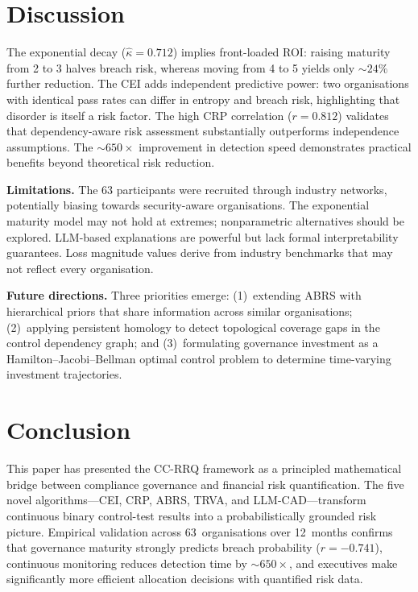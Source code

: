 \documentclass[conference]{IEEEtran}
\begin{document}
\section{Discussion}
\label{sec:discussion}

The exponential decay ($\hat\kappa=0.712$) implies front-loaded ROI: raising maturity from 2 to 3 halves breach risk, whereas moving from 4 to 5 yields only ${\sim}24\%$ further reduction. The CEI adds independent predictive power: two organisations with identical pass rates can differ in entropy and breach risk, highlighting that disorder is itself a risk factor. The high CRP correlation ($r=0.812$) validates that dependency-aware risk assessment substantially outperforms independence assumptions. The ${\sim}650\times$ improvement in detection speed demonstrates practical benefits beyond theoretical risk reduction.

\textbf{Limitations.} The 63 participants were recruited through industry networks, potentially biasing towards security-aware organisations. The exponential maturity model may not hold at extremes; nonparametric alternatives should be explored. LLM-based explanations are powerful but lack formal interpretability guarantees. Loss magnitude values derive from industry benchmarks that may not reflect every organisation.

\textbf{Future directions.} Three priorities emerge: (1)~extending ABRS with hierarchical priors that share information across similar organisations; (2)~applying persistent homology to detect topological coverage gaps in the control dependency graph; and (3)~formulating governance investment as a Hamilton--Jacobi--Bellman optimal control problem to determine time-varying investment trajectories.

\section{Conclusion}
\label{sec:conclusion}

This paper has presented the CC-RRQ framework as a principled mathematical bridge between compliance governance and financial risk quantification. The five novel algorithms---CEI, CRP, ABRS, TRVA, and LLM-CAD---transform continuous binary control-test results into a probabilistically grounded risk picture. Empirical validation across 63~organisations over 12~months confirms that governance maturity strongly predicts breach probability ($r{=}{-}0.741$), continuous monitoring reduces detection time by ${\sim}650\times$, and executives make significantly more efficient allocation decisions with quantified risk data.
\end{document}

